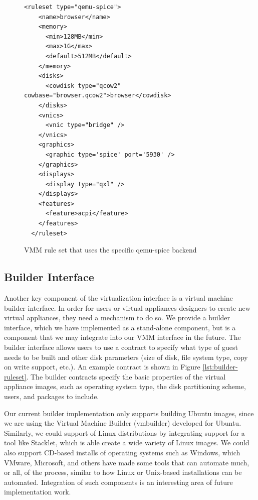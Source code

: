\begin{figure}[tbp]
\caption{VMM rule set that uses the specific qemu-spice backend}
\label{lst:specific-vmm}

\begin{lstlisting}
<ruleset type="qemu-spice">
    <name>browser</name>
    <memory>
      <min>128MB</min>
      <max>1G</max>
      <default>512MB</default>
    </memory>
    <disks>
      <cowdisk type="qcow2" cowbase="browser.qcow2">browser</cowdisk>
    </disks>
    <vnics>
      <vnic type="bridge" />
    </vnics>
    <graphics>
      <graphic type='spice' port='5930' />
    </graphics>
    <displays>  
      <display type="qxl" />
    </displays>
    <features>
      <feature>acpi</feature>
    </features>
  </ruleset>
\end{lstlisting}
\end{figure}

\subsection{Builder Interface}
\label{sec:builder-implementation}

Another key component of the virtualization interface is a virtual machine builder interface. In order for users or virtual appliances designers to create new virtual appliances, they need a mechanism to do so. We provide a builder interface, which we have implemented as a stand-alone component, but is a component that we may integrate into our VMM interface in the future. The builder interface allows users to use a contract to specify what type of guest needs to be built and other disk parameters (size of disk, file system type, copy on write support, etc.). An example contract is shown in Figure \ref{lst:builder-ruleset}. The builder contracts specify the basic properties of the virtual appliance images, such as operating system type, the disk partitioning scheme, users, and packages to include.

Our current builder implementation only supports building Ubuntu images, since we are using the Virtual Machine Builder (vmbuilder)\cite{vmbuilder_website} developed for Ubuntu. Similarly, we could support of Linux distributions by integrating support for a tool like Stacklet\cite{stacklet_website}, which is able create a wide variety of Linux images. We could also support CD-based installs of operating systems such as Windows, which VMware, Microsoft, and others have made some tools that can automate much, or all, of the process, similar to how Linux or Unix-based installations can be automated. Integration of such components is an interesting area of future implementation work.

